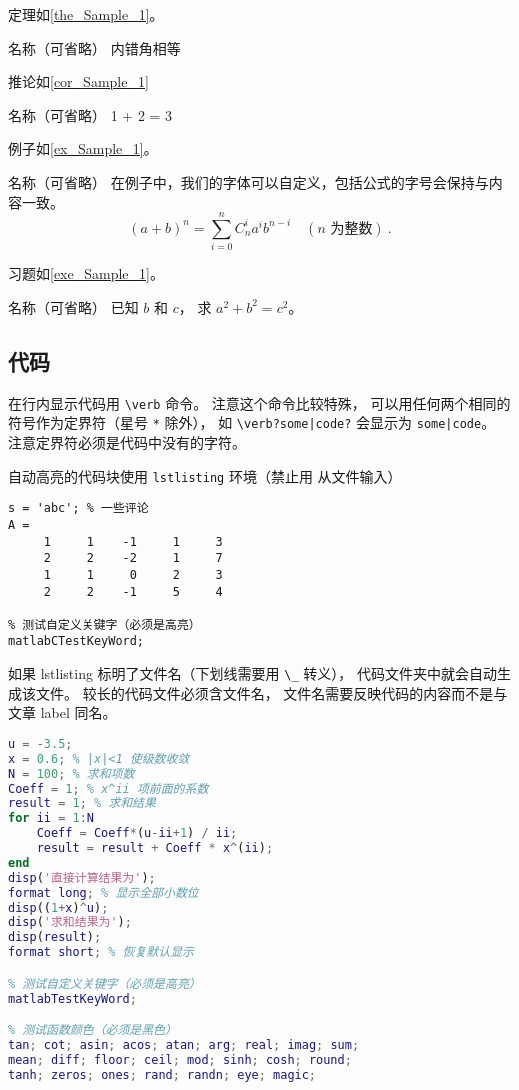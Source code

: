 定理如\autoref{the_Sample_1}。
\begin{theorem}{名称（可省略）}\label{the_Sample_1}
内错角相等
\end{theorem}

推论如\autoref{cor_Sample_1}
\begin{corollary}{名称（可省略）}\label{cor_Sample_1}
1 + 2 = 3
\end{corollary}

例子如\autoref{ex_Sample_1}。 
\begin{example}{名称（可省略）}\label{ex_Sample_1}
在例子中，我们的字体可以自定义，包括公式的字号会保持与内容一致。
\begin{equation}
(a+b)^n = \sum_{i=0}^n C_n^i a^i b^{n-i} \quad (\text{$n$ 为整数})~.
\end{equation}
\end{example}

习题如\autoref{exe_Sample_1}。 
\begin{exercise}{名称（可省略）}\label{exe_Sample_1}
已知 $b$ 和 $c$， 求 $a^2 + b^2 = c^2$。
\end{exercise}

\subsection{代码}
在行内显示代码用 \verb|\verb| 命令。 注意这个命令比较特殊， 可以用任何两个相同的符号作为定界符（星号 \verb|*| 除外）， 如 \verb+\verb?some|code?+ 会显示为 \verb?some|code?。 注意定界符必须是代码中没有的字符。

自动高亮的代码块使用 \verb|lstlisting| 环境（禁止用 \verb|| 从文件输入）
\begin{lstlisting}[language=matlabC]
s = 'abc'; % 一些评论
A =
     1     1    -1     1     3
     2     2    -2     1     7
     1     1     0     2     3
     2     2    -1     5     4

% 测试自定义关键字（必须是高亮）
matlabCTestKeyWord;
\end{lstlisting}

如果 lstlisting 标明了文件名（下划线需要用 \verb|\_| 转义）， 代码文件夹中就会自动生成该文件。 较长的代码文件必须含文件名， 文件名需要反映代码的内容而不是与文章 label 同名。

\begin{lstlisting}[language=matlab, caption=sample\_code.m]
% 验证二项式定理(非整数幂)
u = -3.5;
x = 0.6; % |x|<1 使级数收敛
N = 100; % 求和项数
Coeff = 1; % x^ii 项前面的系数
result = 1; % 求和结果
for ii = 1:N
    Coeff = Coeff*(u-ii+1) / ii;
    result = result + Coeff * x^(ii);
end
disp('直接计算结果为');
format long; % 显示全部小数位
disp((1+x)^u);
disp('求和结果为');
disp(result);
format short; % 恢复默认显示

% 测试自定义关键字（必须是高亮）
matlabTestKeyWord;

% 测试函数颜色（必须是黑色）
tan; cot; asin; acos; atan; arg; real; imag; sum;
mean; diff; floor; ceil; mod; sinh; cosh; round;
tanh; zeros; ones; rand; randn; eye; magic;
\end{lstlisting}

